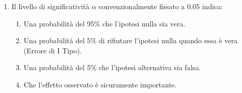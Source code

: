 \documentclass[12pt, a4paper]{article}
\begin{document}
\begin{enumerate}[resume]
    \item Il livello di significatività $\alpha$ convenzionalmente fissato a 0.05 indica:
    \begin{enumerate}
        \item Una probabilità del 95\% che l'ipotesi nulla sia vera.
        \item Una probabilità del 5\% di rifiutare l'ipotesi nulla quando essa è vera (Errore di I Tipo).
        \item Una probabilità del 5\% che l'ipotesi alternativa sia falsa.
        \item Che l'effetto osservato è sicuramente importante.
    \end{enumerate}
    \vspace{0.3cm}
\end{enumerate}

\end{document}
